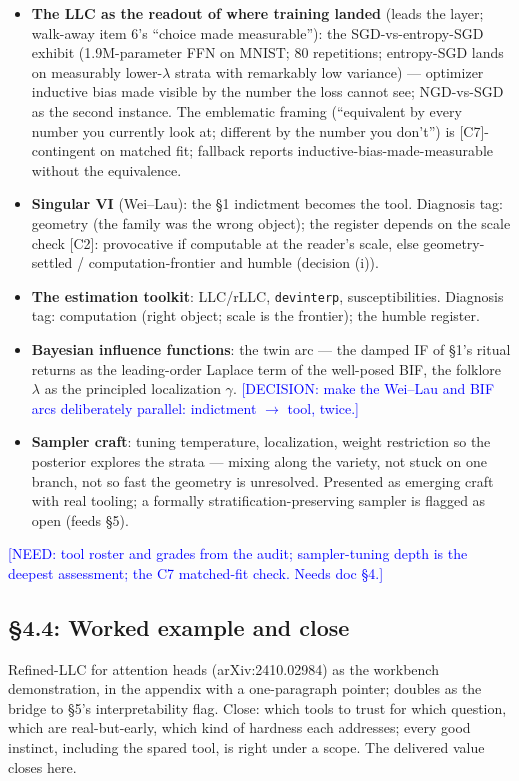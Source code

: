 \documentclass[11pt]{article}
\newcommand{\tagg}[1]{\textcolor{blue}{[#1]}}
\begin{document}
\begin{itemize}[nosep]
\item \textbf{The LLC as the readout of where training landed} (leads
the layer; walk-away item 6's ``choice made measurable''): the
SGD-vs-entropy-SGD exhibit (1.9M-parameter FFN on MNIST; 80 repetitions;
entropy-SGD lands on measurably lower-$\lambda$ strata with remarkably
low variance) --- optimizer inductive bias made visible by the number
the loss cannot see; NGD-vs-SGD as the second instance. The emblematic
framing (``equivalent by every number you currently look at; different
by the number you don't'') is [C7]-contingent on matched fit; fallback
reports inductive-bias-made-measurable without the equivalence.
\item \textbf{Singular VI} (Wei--Lau): the \S1 indictment becomes the
tool. Diagnosis tag: geometry (the family was the wrong object); the
register depends on the scale check [C2]: provocative if computable at
the reader's scale, else geometry-settled / computation-frontier and
humble (decision (i)).
\item \textbf{The estimation toolkit}: LLC/rLLC, \texttt{devinterp},
susceptibilities. Diagnosis tag: computation (right object; scale is the
frontier); the humble register.
\item \textbf{Bayesian influence functions}: the twin arc --- the damped
IF of \S1's ritual returns as the leading-order Laplace term of the
well-posed BIF, the folklore $\lambda$ as the principled localization
$\gamma$. \tagg{DECISION: make the Wei--Lau and BIF arcs deliberately
parallel: indictment $\to$ tool, twice.}
\item \textbf{Sampler craft}: tuning temperature, localization, weight
restriction so the posterior explores the strata --- mixing along the
variety, not stuck on one branch, not so fast the geometry is
unresolved. Presented as emerging craft with real tooling; a formally
stratification-preserving sampler is flagged as open (feeds \S5).
\end{itemize}

\tagg{NEED: tool roster and grades from the audit; sampler-tuning depth
is the deepest assessment; the C7 matched-fit check. Needs doc \S4.}

\subsection*{\S4.4: Worked example and close}

Refined-LLC for attention heads (arXiv:2410.02984) as the workbench
demonstration, in the appendix with a one-paragraph pointer; doubles as
the bridge to \S5's interpretability flag. Close: which tools to trust
for which question, which are real-but-early, which kind of hardness
each addresses; every good instinct, including the spared tool, is right
under a scope. The delivered value closes here.
\end{document}
